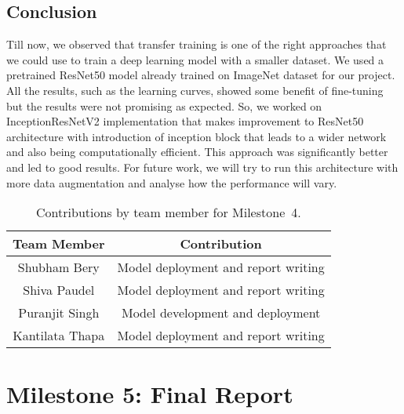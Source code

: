 \documentclass{report}
\begin{document}
\section{Conclusion}
Till now, we observed that transfer training is one of the right approaches that we could use to train a deep learning model with a smaller dataset. We used a pretrained ResNet50 model already trained on ImageNet dataset for our project. All the results, such as the learning curves, showed some benefit of fine-tuning but the results were not promising as expected. So, we worked on InceptionResNetV2 implementation that makes improvement to ResNet50 architecture with introduction of inception block that leads to a wider network and also being computationally efficient. This approach was significantly better and led to good results. For future work, we will try to run this architecture with more data augmentation and analyse how the performance will vary.

\begin{table}[H]
    \caption{Contributions by team member for Milestone~4.}
    \centering
    \begin{tabular}{|c|c|} \hline
    {\bf Team Member}     &  {\bf Contribution}  \\ \hline
    Shubham Bery     &  Model deployment and report writing  \\
    Shiva Paudel   &  Model deployment and report writing \\
    Puranjit Singh &   Model development and deployment \\
    Kantilata Thapa & Model deployment and report writing \\ \hline
    
    \end{tabular}
    \label{tab:contribution4}
\end{table}


\chapter{Milestone 5: Final Report}
\end{document}
